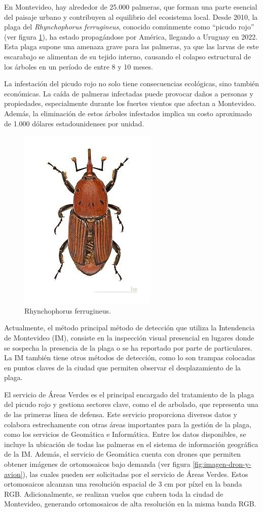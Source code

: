 \documentclass[
11pt, %
]{charter}
\begin{document}
En Montevideo, hay alrededor de 25.000 palmeras, que forman una parte esencial del paisaje urbano y contribuyen al equilibrio del ecosistema local. Desde 2010, la plaga del \textit{Rhynchophorus ferrugineus}, conocido comúnmente como “picudo rojo” (ver figura \ref{fig:picudo-rojo}), ha estado propagándose por América, llegando a Uruguay en 2022. Esta plaga supone una amenaza grave para las palmeras, ya que las larvas de este escarabajo se alimentan de su tejido interno, causando el colapso estructural de los árboles en un período de entre 8 y 10 meses.

La infestación del picudo rojo no solo tiene consecuencias ecológicas, sino también económicas. La caída de palmeras infectadas puede provocar daños a personas y propiedades, especialmente durante los fuertes vientos que afectan a Montevideo. Además, la eliminación de estos árboles infestados implica un costo aproximado de 1.000 dólares estadounidenses por unidad.

\begin{figure}[H]
  \centering
  \includegraphics[width=.30\textwidth]{./Figuras/picudo-rojo.png}
  \caption{Rhynchophorus ferrugineus.}
  \label{fig:picudo-rojo}
\end{figure}

Actualmente, el método principal método de detección que utiliza la Intendencia de Montevideo (IM), consiste en la inspección visual presencial en lugares donde se sospecha la presencia de la plaga o se ha reportado por parte de particulares. La IM también tiene otros métodos de detección, como lo son trampas colocadas en puntos claves de la ciudad que permiten observar el desplazamiento de la plaga.

El servicio de Áreas Verdes es el principal encargado del tratamiento de la plaga del picudo rojo y gestiona sectores clave, como el de arbolado, que representa una de las primeras línea de defensa. Este servicio proporciona diversos datos y colabora estrechamente con otras áreas importantes para la gestión de la plaga, como los servicios de Geomática e Informática. Entre los datos disponibles, se incluye la ubicación de todas las palmeras en el sistema de información geográfica de la IM. Además, el servicio de Geomática cuenta con drones que permiten obtener imágenes de ortomosaicos bajo demanda (ver figura \ref{fig:imagen-dron-y-avion}), las cuales pueden ser solicitadas por el servicio de Áreas Verdes. Estos ortomosaicos alcanzan una resolución espacial de 3 cm por píxel en la banda RGB. Adicionalmente, se realizan vuelos que cubren toda la ciudad de Montevideo, generando ortomosaicos de alta resolución en la misma banda RGB.
\end{document}
